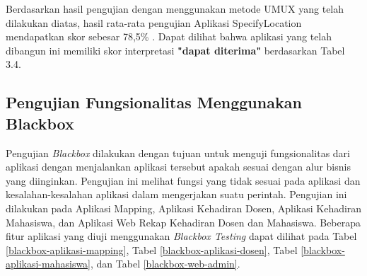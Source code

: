 \par Berdasarkan hasil pengujian dengan menggunakan metode UMUX yang telah dilakukan diatas, hasil rata-rata pengujian Aplikasi SpecifyLocation mendapatkan skor sebesar 78,5\% . Dapat dilihat bahwa aplikasi yang telah dibangun ini memiliki skor interpretasi \textbf{"dapat diterima"} berdasarkan Tabel 3.4.

\subsection{Pengujian Fungsionalitas Menggunakan Blackbox}
\par Pengujian \textit{Blackbox} dilakukan dengan tujuan untuk menguji fungsionalitas dari aplikasi dengan menjalankan aplikasi tersebut apakah sesuai dengan alur bisnis yang diinginkan. Pengujian ini melihat fungsi yang tidak sesuai pada aplikasi dan kesalahan-kesalahan aplikasi dalam mengerjakan suatu perintah. Pengujian ini dilakukan pada Aplikasi Mapping, Aplikasi Kehadiran Dosen, Aplikasi Kehadiran Mahasiswa, dan Aplikasi Web Rekap Kehadiran Dosen dan Mahasiswa. Beberapa fitur aplikasi yang diuji menggunakan \textit{Blackbox Testing} dapat dilihat pada Tabel \ref{blackbox-aplikasi-mapping}, Tabel \ref{blackbox-aplikasi-dosen}, Tabel \ref{blackbox-aplikasi-mahasiswa}, dan Tabel \ref{blackbox-web-admin}.
